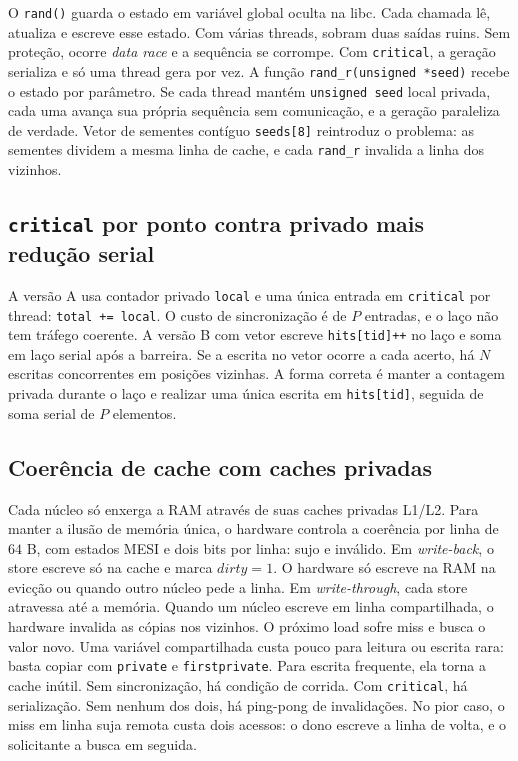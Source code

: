 \documentclass[11pt,letterpaper]{article}
\begin{document}
O \texttt{rand()} guarda o estado em variável global oculta na libc. Cada chamada lê, atualiza e escreve esse estado. Com várias threads, sobram duas saídas ruins. Sem proteção, ocorre \textit{data race} e a sequência se corrompe. Com \texttt{critical}, a geração serializa e só uma thread gera por vez. A função \texttt{rand\_r(unsigned *seed)} recebe o estado por parâmetro. Se cada thread mantém \texttt{unsigned seed} local privada, cada uma avança sua própria sequência sem comunicação, e a geração paraleliza de verdade. Vetor de sementes contíguo \texttt{seeds[8]} reintroduz o problema: as sementes dividem a mesma linha de cache, e cada \texttt{rand\_r} invalida a linha dos vizinhos.

\subsection{\texttt{critical} por ponto contra privado mais redução serial}

A versão A usa contador privado \texttt{local} e uma única entrada em \texttt{critical} por thread: \texttt{total += local}. O custo de sincronização é de $P$ entradas, e o laço não tem tráfego coerente. A versão B com vetor escreve \texttt{hits[tid]++} no laço e soma em laço serial após a barreira. Se a escrita no vetor ocorre a cada acerto, há $N$ escritas concorrentes em posições vizinhas. A forma correta é manter a contagem privada durante o laço e realizar uma única escrita em \texttt{hits[tid]}, seguida de soma serial de $P$ elementos.

\subsection{Coerência de cache com caches privadas}

Cada núcleo só enxerga a RAM através de suas caches privadas L1/L2. Para manter a ilusão de memória única, o hardware controla a coerência por linha de $64$ B, com estados MESI e dois bits por linha: sujo e inválido. Em \textit{write-back}, o store escreve só na cache e marca $dirty=1$. O hardware só escreve na RAM na evicção ou quando outro núcleo pede a linha. Em \textit{write-through}, cada store atravessa até a memória. Quando um núcleo escreve em linha compartilhada, o hardware invalida as cópias nos vizinhos. O próximo load sofre miss e busca o valor novo. Uma variável compartilhada custa pouco para leitura ou escrita rara: basta copiar com \texttt{private} e \texttt{firstprivate}. Para escrita frequente, ela torna a cache inútil. Sem sincronização, há condição de corrida. Com \texttt{critical}, há serialização. Sem nenhum dos dois, há ping-pong de invalidações. No pior caso, o miss em linha suja remota custa dois acessos: o dono escreve a linha de volta, e o solicitante a busca em seguida.
\end{document}
